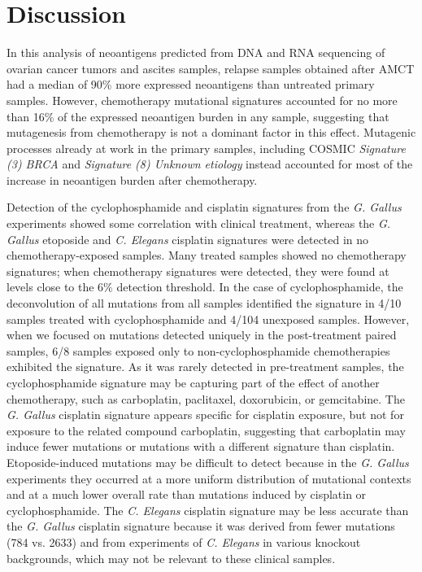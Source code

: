 \section*{Discussion}
In this analysis of neoantigens predicted from DNA and RNA sequencing of ovarian cancer tumors and ascites samples, relapse samples obtained after AMCT had a median of 90\% more expressed neoantigens than untreated primary samples. However, chemotherapy mutational signatures accounted for no more than 16\% of the expressed neoantigen burden in any sample, suggesting that mutagenesis from chemotherapy is not a dominant factor in this effect. Mutagenic processes already at work in the primary samples, including COSMIC \textit{Signature (3) BRCA} and \textit{Signature (8) Unknown etiology} instead accounted for most of the increase in neoantigen burden after chemotherapy.

Detection of the cyclophosphamide and cisplatin signatures from the \textit{G. Gallus} experiments showed some correlation with clinical treatment, whereas the \textit{G. Gallus} etoposide and \textit{C. Elegans} cisplatin signatures were detected in no chemotherapy-exposed samples. Many treated samples showed no chemotherapy signatures; when chemotherapy signatures were detected, they were found at levels close to the 6\% detection threshold. In the case of cyclophosphamide, the deconvolution of all mutations from all samples identified the signature in 4/10 samples treated with cyclophosphamide and 4/104 unexposed samples. However, when we focused on mutations detected uniquely in the post-treatment paired samples, 6/8 samples exposed only to non-cyclophosphamide chemotherapies exhibited the signature. As it was rarely detected in pre-treatment samples, the cyclophosphamide signature may be capturing part of the effect of another chemotherapy, such as carboplatin, paclitaxel, doxorubicin, or gemcitabine. The \textit{G. Gallus} cisplatin signature appears specific for cisplatin exposure, but not for exposure to the related compound carboplatin, suggesting that carboplatin may induce fewer mutations or mutations with a different signature than cisplatin. Etoposide-induced mutations may be difficult to detect because in the \textit{G. Gallus} experiments they occurred at a more uniform distribution of mutational contexts and at a much lower overall rate than mutations induced by cisplatin or cyclophosphamide. The \textit{C. Elegans} cisplatin signature may be less accurate than the \textit{G. Gallus} cisplatin signature because it was derived from fewer mutations (784 vs. 2633) and from experiments of \textit{C. Elegans} in various knockout backgrounds, which may not be relevant to these clinical samples.

